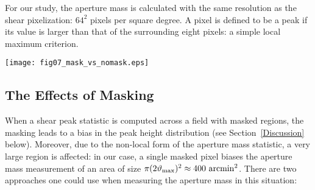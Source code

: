 For our study, the aperture mass is calculated with the same resolution as the
shear pixelization: $64^2$ pixels per square degree.  A pixel is defined to be
a peak if its value is larger than that of the surrounding eight pixels:
a simple local maximum criterion. 

\begin{figure*}
 \centering
 \texttt{[image: fig07\_mask\_vs\_nomask.eps]}
 \caption{
   Comparison of the masked and unmasked peak distributions.
   \textit{left panel:} the peak distributions without the use of KL.
   The black line is the result with no masking, while the red and green
   lines show the two \naive methods of correcting for the mask (see
   Section~\ref{MaskingEffects}).
   \textit{right panel:}  the masked and unmasked peak distributions
   after applying KL. 
   Neither \naive method of mask-correction adequately recovers 
   the underlying peak distribution.  It is evident, however, that 
   the KL-based interpolation procedure recovers a mass map with 
   a similar peak distribution to the unmasked KL map.
   It should be noted that the unmasked peak distribution 
   (black line, left panel) is not identical to the unmasked peak distribution
   after application of KL (black line, right panel).  This difference is
   addressed in Figure~\ref{fig_num_peaks}.
   \label{fig_mask_nomask} 
 }
\end{figure*} 

\subsection{The Effects of Masking}
\label{MaskingEffects}
When a shear peak statistic is computed across a field with masked regions,
the masking leads to a bias in the peak height distribution
(see Section~\ref{Discussion} below).  Moreover, due
to the non-local form of the aperture mass statistic, a very large region is
affected: in our case, a single masked pixel biases the aperture mass 
measurement of an area of size
 $\pi(2\vartheta_{\rm max})^2 \approx 400\ {\rm arcmin}^2$.  
There are two \naive approaches one could use when measuring the 
aperture mass in this situation:

